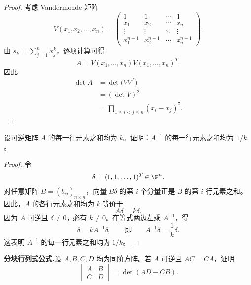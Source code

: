 \begin{proof}
	考虑 Vandermonde 矩阵
	\[
	V(x_1,x_2,\ldots,x_n)
	=\begin{pmatrix}
		1&1&\cdots&1\\
		x_1&x_2&\cdots&x_n\\
		\vdots&\vdots&\ddots&\vdots\\
		x_1^{n-1}&x_2^{n-1}&\cdots&x_n^{n-1}
	\end{pmatrix}.
	\]
	由 $s_k=\sum_{j=1}^{n}x_j^k$，逐项计算可得
	\[
	A=V(x_1,\ldots,x_n)V(x_1,\ldots,x_n)^T.
	\]
	因此
	\[
	\begin{aligned}
		\det A
		&=\det\bigl(VV^T\bigr)\\
		&=(\det V)^2\\
		&=\prod_{1\leq i<j\leq n}(x_i-x_j)^2.
	\end{aligned}
	\]
\end{proof}

\begin{problem}
设可逆矩阵 $A$ 的每一行元素之和均为 $k$。证明：$A^{-1}$ 的每一行元素之和均为 $1/k$。
\end{problem}

\begin{proof}
	令
	\[
	\delta=(1,1,\ldots,1)^T\in\F^n.
	\]
	对任意矩阵 $B=(b_{ij})_{n\times n}$，向量 $B\delta$ 的第 $i$ 个分量正是 $B$ 的第 $i$ 行元素之和。因此，$A$ 的各行元素之和均为 $k$ 等价于
	\[
	A\delta=k\delta.
	\]
	因为 $A$ 可逆且 $\delta\neq0$，必有 $k\neq0$。在等式两边左乘 $A^{-1}$，得
	\[
	\delta=kA^{-1}\delta,
	\qquad\text{即}
	\qquad
	A^{-1}\delta=\frac1k\delta.
	\]
	这表明 $A^{-1}$ 的每一行元素之和均为 $1/k$。
\end{proof}

\begin{problem}
	\textbf{分块行列式公式.}\quad 设 $A,B,C,D$ 均为同阶方阵。若 $A$ 可逆且 $AC=CA$，证明
	\[
	\begin{vmatrix}
		A&B\\
		C&D
	\end{vmatrix}
	=\det(AD-CB).
	\]
\end{problem}

